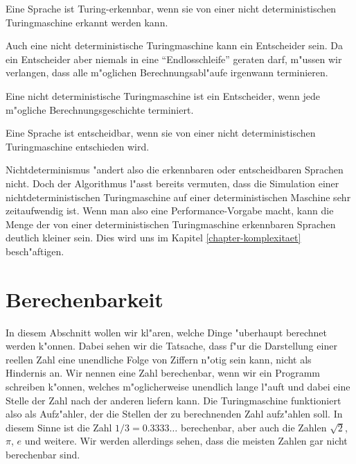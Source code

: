 \begin{satz}
Eine Sprache ist Turing-erkennbar, wenn sie von einer nicht deterministischen
Turingmaschine erkannt werden kann.
\end{satz}

Auch eine nicht deterministische Turingmaschine kann ein Entscheider sein.
Da ein Entscheider aber niemals in eine ``Endlosschleife'' geraten darf,
m"ussen wir verlangen, dass alle m"oglichen Berechnungsabl"aufe 
irgenwann terminieren.

\begin{definition}
Eine nicht deterministische Turingmaschine ist ein Entscheider, wenn
jede m"ogliche Berechnungsgeschichte terminiert.
\end{definition}

\begin{satz}
Eine Sprache ist entscheidbar, wenn sie von einer nicht deterministischen
Turingmaschine entschieden wird.
\end{satz}

Nichtdeterminismus "andert also die erkennbaren oder entscheidbaren Sprachen
nicht. Doch der Algorithmus l"asst bereits vermuten, dass die Simulation
einer nichtdeterministischen Turingmaschine auf einer deterministischen
Maschine sehr zeitaufwendig ist. Wenn man also eine Performance-Vorgabe
macht, kann die Menge der von einer deterministischen Turingmaschine
erkennbaren Sprachen deutlich kleiner sein. Dies wird uns im Kapitel
\ref{chapter-komplexitaet} besch"aftigen.

\section{Berechenbarkeit}
In diesem Abschnitt wollen wir kl"aren, welche Dinge "uberhaupt
berechnet werden k"onnen. Dabei sehen wir die Tatsache, dass f"ur
die Darstellung einer reellen Zahl eine unendliche Folge von Ziffern
n"otig sein kann, nicht als Hindernis an. Wir nennen eine Zahl
berechenbar, wenn wir ein Programm schreiben k"onnen, welches 
m"oglicherweise unendlich lange l"auft und dabei eine Stelle der
Zahl nach der anderen liefern kann. Die Turingmaschine
funktioniert also als Aufz"ahler, der die Stellen der zu berechnenden
Zahl aufz"ahlen soll.  In diesem Sinne ist die
Zahl $1/3=0.3333\dots$ berechenbar, aber auch die Zahlen $\sqrt{2}$, $\pi$,
$e$ und weitere. Wir werden allerdings sehen, dass die meisten
Zahlen gar nicht berechenbar sind.

